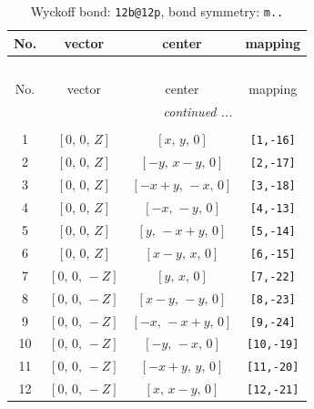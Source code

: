 \documentclass[fleqn,8pt]{jsarticle}
\begin{document}
\begin{longtable}{cccc}
\caption{Wyckoff bond: {\tt 12b@12p}, bond symmetry: {\tt m..}}
 \\
 \hline \hline
No. & vector & center & mapping \\ \hline \endfirsthead

\multicolumn{3}{l}{\tablename\ \thetable{}} \\
 \hline \hline
No. & vector & center & mapping \\ \hline \endhead

 \hline \hline
\multicolumn{3}{r}{\footnotesize\it continued ...} \\ \endfoot

 \hline \hline
\multicolumn{3}{r}{} \\ \endlastfoot

1 & $\left[ 0,\, 0,\, Z \right]$ & $\left[ x,\, y,\, 0 \right]$ & {\tt [1,-16]} \\ \hline
2 & $\left[ 0,\, 0,\, Z \right]$ & $\left[ - y,\, x - y,\, 0 \right]$ & {\tt [2,-17]} \\ \hline
3 & $\left[ 0,\, 0,\, Z \right]$ & $\left[ - x + y,\, - x,\, 0 \right]$ & {\tt [3,-18]} \\ \hline
4 & $\left[ 0,\, 0,\, Z \right]$ & $\left[ - x,\, - y,\, 0 \right]$ & {\tt [4,-13]} \\ \hline
5 & $\left[ 0,\, 0,\, Z \right]$ & $\left[ y,\, - x + y,\, 0 \right]$ & {\tt [5,-14]} \\ \hline
6 & $\left[ 0,\, 0,\, Z \right]$ & $\left[ x - y,\, x,\, 0 \right]$ & {\tt [6,-15]} \\ \hline
7 & $\left[ 0,\, 0,\, - Z \right]$ & $\left[ y,\, x,\, 0 \right]$ & {\tt [7,-22]} \\ \hline
8 & $\left[ 0,\, 0,\, - Z \right]$ & $\left[ x - y,\, - y,\, 0 \right]$ & {\tt [8,-23]} \\ \hline
9 & $\left[ 0,\, 0,\, - Z \right]$ & $\left[ - x,\, - x + y,\, 0 \right]$ & {\tt [9,-24]} \\ \hline
10 & $\left[ 0,\, 0,\, - Z \right]$ & $\left[ - y,\, - x,\, 0 \right]$ & {\tt [10,-19]} \\ \hline
11 & $\left[ 0,\, 0,\, - Z \right]$ & $\left[ - x + y,\, y,\, 0 \right]$ & {\tt [11,-20]} \\ \hline
12 & $\left[ 0,\, 0,\, - Z \right]$ & $\left[ x,\, x - y,\, 0 \right]$ & {\tt [12,-21]} \\
\end{longtable}
\renewcommand{\arraystretch}{1.2}
\end{document}
